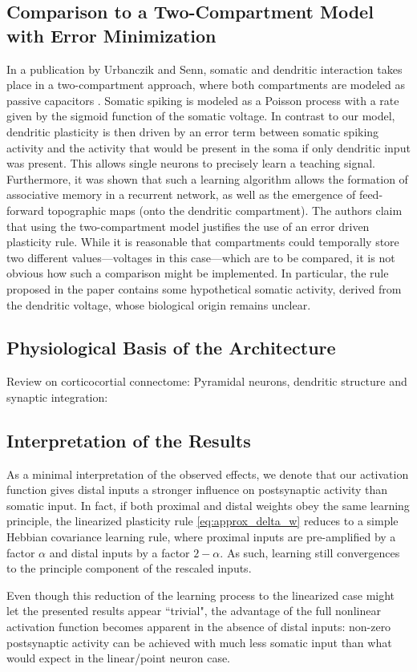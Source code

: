 \documentclass[10pt,a4paper]{article}
\begin{document}
\subsection{Comparison to a Two-Compartment Model with Error Minimization}
In a publication by Urbanczik and Senn, somatic and dendritic interaction takes place in a two-compartment approach, where both compartments are modeled as passive capacitors \cite{Urbanczik_2014}. Somatic spiking is modeled as a Poisson process with a rate given by the sigmoid function of the somatic voltage. In contrast to our model, dendritic plasticity is then driven by an error term between somatic spiking activity and the activity that would be present in the soma if only dendritic input was present. This allows single neurons to precisely learn a teaching signal. Furthermore, it was shown that such a learning algorithm allows the formation of associative memory in a recurrent network, as well as the emergence of feed-forward topographic maps (onto the dendritic compartment). The authors claim that using the two-compartment model justifies the use of an error driven plasticity rule. While it is reasonable that compartments could temporally store two different values---voltages in this case---which are to be compared, it is not obvious how such a comparison might be implemented. In particular, the rule proposed in the paper contains some hypothetical somatic activity, derived from the dendritic voltage, whose biological origin remains unclear.

\subsection{Physiological Basis of the Architecture}
Review on corticocortial connectome: \cite{Barbas_2015}
Pyramidal neurons, dendritic structure and synaptic integration: \cite{Spruston_2008}

\subsection{Interpretation of the Results}

As a minimal interpretation of the observed effects, we denote that our activation function gives distal inputs a stronger influence on postsynaptic activity than somatic input. In fact, if both proximal and distal weights obey the same learning principle, the linearized plasticity rule \eqref{eq:approx_delta_w} reduces to a simple Hebbian covariance learning rule, where proximal inputs are pre-amplified by a factor $\alpha$ and distal inputs by a factor $2-\alpha$. As such, learning still convergences to the principle component of the rescaled inputs.

Even though this reduction of the learning process to the linearized case might let the presented results appear ``trivial", the advantage of the full nonlinear activation function becomes apparent in the absence of distal inputs: non-zero postsynaptic activity can be achieved with much less somatic input than what would expect in the linear/point neuron case.



\end{document}
